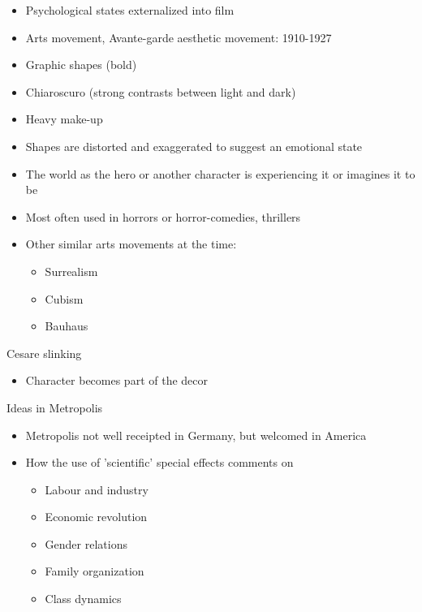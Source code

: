 \documentclass[11pt,fleqn]{book} %
\begin{document}
\begin{descriptions}
\begin{itemize}
        \item Psychological states externalized into film
        \item Arts movement, Avante-garde aesthetic movement: 1910-1927
        \item Graphic shapes (bold)
        \item Chiaroscuro (strong contrasts between light and dark)
        \item Heavy make-up
        \item Shapes are distorted and exaggerated to suggest an emotional state
        \item The world as the hero or another character is experiencing it or imagines it to be
        \item Most often used in horrors or horror-comedies, thrillers
        \item Other similar arts movements at the time:
        \begin{itemize}
            \item Surrealism
            \item Cubism
            \item Bauhaus
        \end{itemize}
    \end{itemize}
    \item[Cesare slinking] 
    \begin{descriptions}
    \end{descriptions}
    \begin{itemize}
        \item Character becomes part of the decor
    \end{itemize}
    \item[Ideas in Metropolis]
    \begin{descriptions}
    \end{descriptions}
    \begin{itemize}
        \item Metropolis not well receipted in Germany, but welcomed in America
        \item How the use of 'scientific' special effects comments on
        \begin{itemize}
            \item Labour and industry
            \item Economic revolution
            \item Gender relations
            \item Family organization
            \item Class dynamics

\end{itemize}
\end{itemize}
\end{descriptions}
\end{document}
